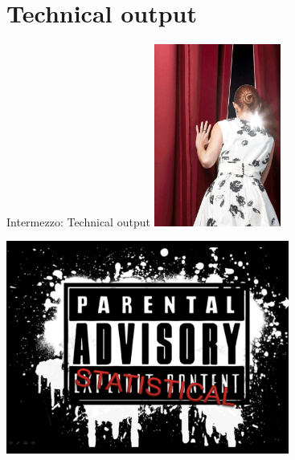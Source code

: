 \documentclass[10pt]{beamer}\usepackage[]{graphicx}\usepackage[]{xcolor}
\begin{document}
\section{Technical output}
%
\begin{frame}{Intermezzo: Technical output}
\includegraphics[height=6cm,keepaspectratio=T] {behind_the_scenes.png}
\end{frame}
%
\begin{frame}
\includegraphics[height=7cm,keepaspectratio=T] {parental_advisory.png}
\end{frame}
%
%
\end{document}

